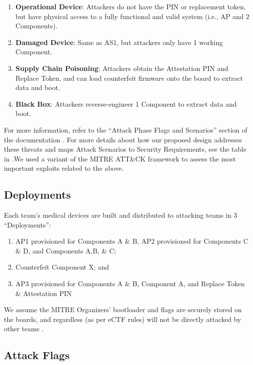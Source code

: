 \begin{enumerate}[label={\textbf{(AS\arabic*)}}, leftmargin=0.55in]
\item \textbf{Operational Device}: Attackers do not have the PIN or replacement token, but have physical access to a fully functional and valid system (i.e., AP and 2 Components).

\item \textbf{Damaged Device}: Same as AS1, but attackers only have 1 working Component.

\item \textbf{Supply Chain Poisoning}: Attackers obtain the Attestation PIN and Replace Token, and can load counterfeit firmware onto the board to extract data and boot.

\item \textbf{Black Box}: Attackers reverse-engineer 1 Component to extract data and boot.
\end{enumerate}

For more information, refer to the ``Attack Phase Flags and Scenarios'' section of the documentation \cite{eCTFOfficial}. \iflong For more details about how our proposed design addresses these threats and maps Attack Scenarios to Security Requirements, see the table in .\else We used a variant of the MITRE ATT\&CK framework to assess the most important exploits related to the above.\fi

\subsection{Deployments}

Each team's medical devices are built and distributed to attacking teams in 3 ``Deployments'':
\begin{enumerate}[label={\textbf{(D\arabic*)}}, leftmargin=0.55in]
    \item AP1 provisioned for Components A \& B, AP2 provisioned for Components C \& D, and Components A,B, \& C;
    \item Counterfeit Component X; and
    \item AP3 provisioned for Components A \& B, Component A, and Replace Token \& Attestation PIN
\end{enumerate}
We assume the MITRE Organizers' bootloader and flags are securely stored on the boards, and regardless (as per eCTF rules) will not be directly attacked by other teams \cite{eCTFOfficial}.

\subsection{Attack Flags}

